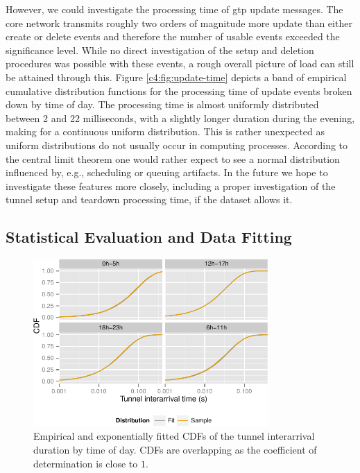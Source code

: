 However, we could investigate the processing time of \gls{gtp} update messages. The core network transmits roughly two orders of magnitude more update than either create or delete events and therefore the number of usable events exceeded the significance level. While no direct investigation of the setup and deletion procedures was possible with these events, a rough overall picture of load can still be attained through this. Figure \ref{c4:fig:update-time} depicts a band of empirical cumulative distribution functions for the processing time of update events broken down by time of day. The processing time is almost uniformly distributed between 2 and 22 milliseconds, with a slightly longer duration during the evening, making for a continuous uniform distribution. This is rather unexpected as uniform distributions do not usually occur in computing processes. According to the central limit theorem one would rather expect to see a normal distribution influenced by, e.g., scheduling or queuing artifacts. In the future we hope to investigate these features more closely, including a proper investigation of the tunnel setup and teardown processing time, if the dataset allows it.



\subsection{Statistical Evaluation and Data Fitting}
\label{c4:sec:statistical_evaluation}


\begin{figure}[htb]
  \centering
  \includegraphics[width=0.8\textwidth]{images/R-IAT-active-fit-cdf-facets.pdf}
  \caption{Empirical and exponentially fitted CDFs of the tunnel interarrival duration by time of day. CDFs are overlapping as the coefficient of determination is close to $1$.}
  \label{fig:pdparrivalsecdf}
\end{figure}

